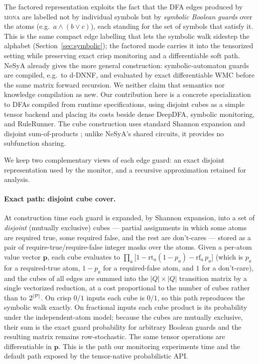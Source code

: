 The factored representation exploits the fact that the DFA edges produced by \textsc{mona} are labelled not by individual symbols but by \emph{symbolic Boolean guards} over the atoms (e.g.\ $a \land (b \lor c)$), each standing for the set of symbols that satisfy it. This is the same compact edge labelling that lets the symbolic walk sidestep the alphabet (Section~\ref{sec:symbolic}); the factored mode carries it into the tensorized setting while preserving exact crisp monitoring and a differentiable soft path. NeSyA \cite{NesyA} already gives the more general construction: symbolic-automaton guards are compiled, e.g.\ to d-DNNF, and evaluated by exact differentiable WMC before the same matrix forward recursion. We neither claim that semantics nor knowledge compilation as new. Our contribution here is a concrete specialization to DFAs compiled from \ltlf runtime specifications, using disjoint cubes as a simple tensor backend and placing its costs beside dense DeepDFA, symbolic monitoring, and RuleRunner. The cube construction uses standard Shannon expansion and disjoint sum-of-products \cite{darwiche2002knowledge}; unlike NeSyA's shared circuits, it provides no subfunction sharing.

We keep two complementary views of each edge guard: an exact disjoint representation used by the monitor, and a recursive approximation retained for analysis.

\paragraph{Exact path: disjoint cube cover.} At construction time each guard is expanded, by Shannon expansion, into a set of \emph{disjoint} (mutually exclusive) cubes --- partial assignments in which some atoms are required true, some required false, and the rest are don't-cares --- stored as a pair of require-true/require-false integer masks over the atoms. Given a per-atom value vector $\mathbf{p}$, each cube evaluates to $\prod_a \big[1 - \mathrm{rt}_a (1 - p_a) - \mathrm{rf}_a\, p_a\big]$ (which is $p_a$ for a required-true atom, $1 - p_a$ for a required-false atom, and $1$ for a don't-care), and the cubes of all edges are summed into the $|Q| \times |Q|$ transition matrix by a single vectorized reduction, at a cost proportional to the number of cubes rather than to $2^{|{\mathcal{P}}|}$. On crisp $0/1$ inputs each cube is $0/1$, so this path reproduces the symbolic walk exactly. On fractional inputs each cube product is its probability under the independent-atom model; because the cubes are mutually exclusive, their sum is the exact guard probability for arbitrary Boolean guards and the resulting matrix remains row-stochastic. The same tensor operations are differentiable in $\mathbf p$. This is the path our monitoring experiments time and the default path exposed by the tensor-native probabilistic API.

